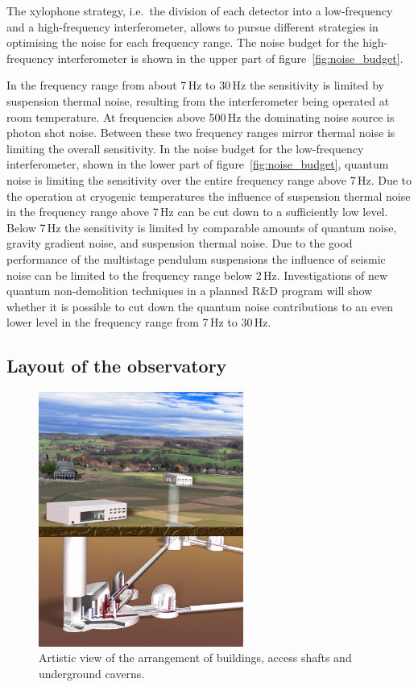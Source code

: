 The xylophone strategy, i.e.\ the division of each detector into a low-frequency 
and a high-frequency interferometer, allows to pursue different strategies in 
optimising the noise for each frequency range. The noise budget for the 
high-frequency interferometer is shown in the upper part of figure~\ref{fig:noise_budget}. 

In the frequency range from about 7\,Hz to 30\,Hz the sensitivity is limited by
suspension thermal noise, resulting from the interferometer being operated 
at room temperature. At frequencies above 500\,Hz the dominating noise 
source is photon shot noise. Between these two frequency ranges mirror 
thermal noise is limiting the overall sensitivity. In the noise budget for the 
low-frequency interferometer, shown in the lower part of 
figure~\ref{fig:noise_budget}, quantum noise is limiting the sensitivity over 
the entire frequency range above 7\,Hz. Due to the operation at cryogenic 
temperatures the influence of suspension thermal noise in the frequency 
range above 7\,Hz can be cut down to a sufficiently low level. Below 7\,Hz 
the sensitivity is limited by comparable amounts of quantum noise, 
gravity gradient noise, and suspension thermal noise. Due to the good 
performance of the multistage pendulum suspensions the influence of 
seismic noise can be limited to the frequency range below 2\,Hz. Investigations 
of new quantum non-demolition techniques in a planned R\&D program will 
show whether it is possible to cut down the quantum noise contributions to 
an even lower level in the frequency range from 7\,Hz to 30\,Hz.

\FloatBarrier
\clearpage
\subsection{Layout of the observatory}

\begin{figure}
\centering
\vskip -0.35cm
\includegraphics[width=0.6\textwidth]{Intro/Intro_Figures/ArtisticViewBuildings.jpg}
\vskip 0.3cm
\caption{Artistic view of the arrangement of buildings, access shafts and underground caverns.}
\vskip -0.1cm
\label{Fig:Buildings}
\end{figure} 

